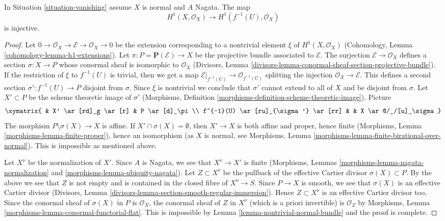 \begin{lemma}
\label{lemma-H1-injective}
In Situation \ref{situation-vanishing} assume $X$ is normal
and $A$ Nagata. The map
$$
H^1(X, \mathcal{O}_X) \longrightarrow H^1(f^{-1}(U), \mathcal{O}_X)
$$
is injective.
\end{lemma}

\begin{proof}
Let $0 \to \mathcal{O}_X \to \mathcal{E} \to \mathcal{O}_X \to 0$ be the
extension corresponding to a nontrivial element $\xi$ of
$H^1(X, \mathcal{O}_X)$
(Cohomology, Lemma \ref{cohomology-lemma-h1-extensions}).
Let $\pi : P = \mathbf{P}(\mathcal{E}) \to X$
be the projective bundle associated to $\mathcal{E}$.
The surjection $\mathcal{E} \to \mathcal{O}_X$
defines a section $\sigma : X \to P$ whose conormal sheaf is
isomorphic to $\mathcal{O}_X$ (Divisors, Lemma
\ref{divisors-lemma-conormal-sheaf-section-projective-bundle}).
If the restriction of $\xi$ to $f^{-1}(U)$ is trivial, then we get
a map $\mathcal{E}|_{f^{-1}(U)} \to \mathcal{O}_{f^{-1}(U)}$ splitting
the injection $\mathcal{O}_X \to \mathcal{E}$. This defines a second
section $\sigma' : f^{-1}(U) \to P$ disjoint from $\sigma$. Since $\xi$
is nontrivial we conclude that $\sigma'$ cannot extend to all of $X$
and be disjoint from $\sigma$. Let $X' \subset P$ be the
scheme theoretic image of $\sigma'$ (Morphisms,
Definition \ref{morphisms-definition-scheme-theoretic-image}).
Picture
$$
\xymatrix{
& X' \ar[rd]_g \ar[r] & P \ar[d]_\pi \\
f^{-1}(U) \ar[ru]_{\sigma'} \ar[rr] & & X \ar@/_/[u]_\sigma
}
$$
The morphism $P \setminus \sigma(X) \to X$ is affine.
If $X' \cap \sigma(X) = \emptyset$, then $X' \to X$ is both affine
and proper, hence finite
(Morphisms, Lemma \ref{morphisms-lemma-finite-proper}),
hence an isomorphism (as $X$ is normal, see
Morphisms, Lemma \ref{morphisms-lemma-finite-birational-over-normal}).
This is impossible as mentioned above.

\medskip\noindent
Let $X^\nu$ be the normalization of $X'$.
Since $A$ is Nagata, we see that $X^\nu \to X'$ is finite
(Morphisms, Lemmas \ref{morphisms-lemma-nagata-normalization} and
\ref{morphisms-lemma-ubiquity-nagata}). Let $Z \subset X^\nu$ be the
pullback of the effective Cartier divisor $\sigma(X) \subset P$.
By the above we see that $Z$ is not empty and is contained
in the closed fibre of $X^\nu \to S$.
Since $P \to X$ is smooth, we see that $\sigma(X)$ is an effective
Cartier divisor
(Divisors, Lemma \ref{divisors-lemma-section-smooth-regular-immersion}).
Hence $Z \subset X^\nu$ is an effective Cartier divisor too.
Since the conormal sheaf of $\sigma(X)$ in $P$ is $\mathcal{O}_X$, the
conormal sheaf of $Z$ in $X^\nu$ (which is a priori invertible)
is $\mathcal{O}_Z$ by
Morphisms, Lemma \ref{morphisms-lemma-conormal-functorial-flat}.
This is impossible by
Lemma \ref{lemma-nontrivial-normal-bundle}
and the proof is complete.
\end{proof}

